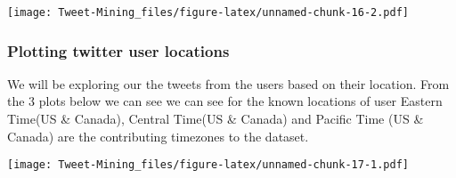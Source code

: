 \documentclass[
]{article}
\newenvironment{Shaded}{\begin{snugshade}}{\end{snugshade}}
\newcommand{\CommentTok}[1]{\textcolor[rgb]{0.56,0.35,0.01}{\textit{#1}}}
\newcommand{\DataTypeTok}[1]{\textcolor[rgb]{0.13,0.29,0.53}{#1}}
\newcommand{\DecValTok}[1]{\textcolor[rgb]{0.00,0.00,0.81}{#1}}
\newcommand{\KeywordTok}[1]{\textcolor[rgb]{0.13,0.29,0.53}{\textbf{#1}}}
\newcommand{\NormalTok}[1]{#1}
\newcommand{\OperatorTok}[1]{\textcolor[rgb]{0.81,0.36,0.00}{\textbf{#1}}}
\newcommand{\StringTok}[1]{\textcolor[rgb]{0.31,0.60,0.02}{#1}}
\begin{document}
\texttt{[image: Tweet-Mining\_files/figure-latex/unnamed-chunk-16-2.pdf]}

\hypertarget{plotting-twitter-user-locations}{%
\subsubsection{Plotting twitter user
locations}\label{plotting-twitter-user-locations}}

We will be exploring our the tweets from the users based on their
location. From the 3 plots below we can see we can see for the known
locations of user Eastern Time(US \& Canada), Central Time(US \& Canada)
and Pacific Time (US \& Canada) are the contributing timezones to the
dataset.

\begin{Shaded}
\end{Shaded}

\texttt{[image: Tweet-Mining\_files/figure-latex/unnamed-chunk-17-1.pdf]}
\end{document}
